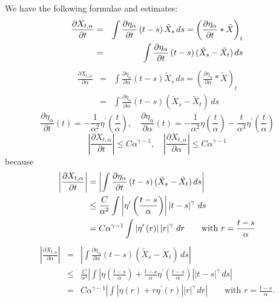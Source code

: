 \documentclass{article}
\begin{document}
We have the following formulae and estimates: 
\begin{eqnarray*}
\frac{\partial X_{t,\alpha }}{\partial t} &=&\int \frac{\partial \eta
_{\alpha }}{\partial t}\left( t-s\right) \tilde{X}_{s}\,ds=\left( \frac{%
\partial \eta _{\alpha }}{\partial t}\ast \tilde{X}\right) _{t} \\
&=&\int \frac{\partial \eta _{\alpha }}{\partial t}\left( t-s\right) ( 
\tilde{X}_{s}-\tilde{X}_{t}) \,ds
\end{eqnarray*}
\begin{eqnarray*}
\frac{\partial X_{t,\alpha }}{\partial \alpha } &=&\int \frac{\partial \eta
_{\alpha }}{\partial \alpha }\left( t-s\right) \tilde{X}_{s}\,ds=\left( 
\frac{\partial \eta _{\alpha }}{\partial \alpha }\ast \tilde{X}\right) _{t}
\\
&=&\int \frac{\partial \eta _{\alpha }}{\partial \alpha }\left( t-s\right)
( \tilde{X}_{s}-\tilde{X}_{t}) \,ds
\end{eqnarray*}
\begin{equation*}
\frac{\partial \eta _{\alpha }}{\partial t}\left( t\right) =-\frac{1}{\alpha
^{2}}\eta ^{\prime }\left( \frac{t}{\alpha }\right) ,\quad \frac{\partial
\eta _{\alpha }}{\partial \alpha }\left( t\right) =-\frac{1}{\alpha ^{2}}%
\eta \left( \frac{t}{\alpha }\right) -\frac{t}{\alpha ^{3}}\eta ^{\prime
}\left( \frac{t}{\alpha }\right)
\end{equation*}
\begin{equation*}
\left| \frac{\partial X_{t,\alpha }}{\partial t}\right| \leq C\alpha
^{\gamma -1},\quad \left| \frac{\partial X_{t,\alpha }}{\partial \alpha }%
\right| \leq C\alpha ^{\gamma -1}
\end{equation*}
because 
\begin{equation*}
\begin{split}
\left| \frac{\partial X_{t,\alpha }}{\partial t}\right| &=\left| \int \frac{%
\partial \eta _{\alpha }}{\partial t}\left( t-s\right) ( \tilde{X}_{s}-%
\tilde{X}_{t}) \,ds\right| \\
&\leq \frac{C}{\alpha ^{2}}\int \left| \eta ^{\prime }\left( \frac{t-s}{%
\alpha }\right) \right| \left| t-s\right| ^{\gamma }\,ds \\
&= C\alpha ^{\gamma -1}\int \left| \eta
^{\prime }\left( r\right) \right| \left| r\right| ^{\gamma }\,dr
\qquad \text{with $r=\frac{t-s}{\alpha }$}
\end{split}
\end{equation*}
\begin{eqnarray*}
\left| \frac{\partial X_{t,\alpha }}{\partial \alpha }\right| &=&\left| \int 
\frac{\partial \eta _{\alpha }}{\partial \alpha }\left( t-s\right) \left( 
\tilde{X}_{s}-\tilde{X}_{t}\right) \,ds\right| \\
&\leq &\frac{C}{\alpha ^{2}}\left| \int \left| \eta \left( \frac{t-s}{\alpha 
}\right) +\frac{t-s}{\alpha }\eta ^{\prime }\left( \frac{t-s}{\alpha }%
\right) \right| \left| t-s\right| ^{\gamma }\,ds\right| \\
&=& C\alpha ^{\gamma -1}\left| \int \left|
\eta \left( r\right) +r\eta ^{\prime }\left( r\right) \right| \left|
r\right| ^{\gamma }\,dr\right| \qquad \text{with $r=\frac{t-s}{\alpha }$}.
\end{eqnarray*}
\end{document}
